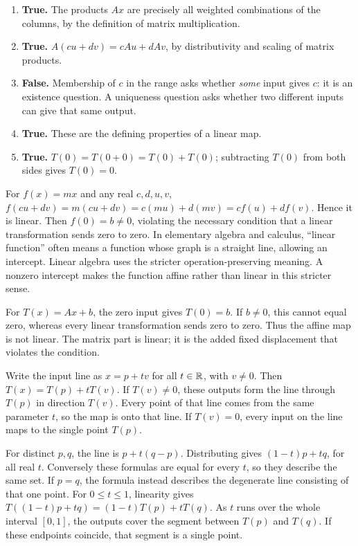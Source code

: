 \begin{enumerate}[label=(\alph*)]
\item \textbf{True.} The products $Ax$ are precisely all weighted
combinations of the columns, by the definition of matrix multiplication.
\item \textbf{True.} $A(cu+dv)=cAu+dAv$, by distributivity and scaling
of matrix products.
\item \textbf{False.} Membership of $c$ in the range asks whether
\emph{some} input gives $c$: it is an existence question. A uniqueness
question asks whether two different inputs can give that same output.
\item \textbf{True.} These are the defining properties of a linear map.
\item \textbf{True.} $T(0)=T(0+0)=T(0)+T(0)$; subtracting $T(0)$
from both sides gives $T(0)=0$.
\end{enumerate}

For $f(x)=mx$ and any real $c,d,u,v$,
$f(cu+dv)=m(cu+dv)=c(mu)+d(mv)=cf(u)+df(v)$. Hence it is linear.
Then $f(0)=b\ne0$, violating the necessary condition that a linear
transformation sends zero to zero.
In elementary algebra and calculus, ``linear function'' often means a
function whose graph is a straight line, allowing an intercept. Linear
algebra uses the stricter operation-preserving meaning. A nonzero intercept
makes the function affine rather than linear in this stricter sense.

For $T(x)=Ax+b$, the zero input gives $T(0)=b$. If $b\ne0$,
this cannot equal zero, whereas every linear transformation sends zero
to zero. Thus the affine map is not linear. The matrix part is linear;
it is the added fixed displacement that violates the condition.

Write the input line as $x=p+tv$ for all $t\in\mathbb{R}$, with $v\ne0$.
Then $T(x)=T(p)+tT(v)$. If $T(v)\ne0$, these outputs form the
line through $T(p)$ in direction $T(v)$. Every point of that line
comes from the same parameter $t$, so the map is onto that line.
If $T(v)=0$, every input on the line maps to the single point $T(p)$.

For distinct $p,q$, the line is $p+t(q-p)$. Distributing gives
$(1-t)p+tq$, for all real $t$. Conversely these formulas are equal
for every $t$, so they describe the same set. If $p=q$, the formula
instead describes the degenerate line consisting of that one point.
For $0\le t\le1$, linearity gives
$T((1-t)p+tq)=(1-t)T(p)+tT(q)$. As $t$ runs over the whole
interval $[0,1]$, the outputs cover the segment between $T(p)$ and
$T(q)$. If these endpoints coincide, that segment is a single point.

